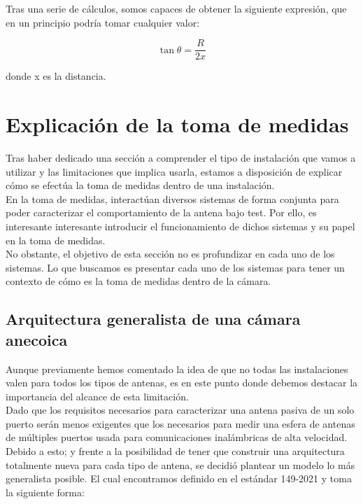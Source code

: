 \documentclass{article}
\begin{document}
Tras una serie de cálculos, somos capaces de obtener la siguiente expresión, que en un principio podría tomar cualquier valor: 

                        \begin{equation}
                        \tan\theta =\frac{R}{2x}
                        \end{equation}

donde x es la distancia. 

\newpage
\section{Explicación de la toma de medidas}
Tras haber dedicado una sección a comprender el tipo de instalación que vamos a utilizar y las limitaciones que implica usarla, estamos a disposición de explicar cómo se efectúa la toma de medidas dentro de una instalación.\\
En la toma de medidas, interactúan diversos sistemas de forma conjunta para poder caracterizar el comportamiento de la antena bajo test. Por ello, es interesante interesante introducir el funcionamiento de dichos sistemas y su papel en la toma de medidas. 
\\

No obstante, el objetivo de esta sección no es profundizar en cada uno de los sistemas. Lo que buscamos es presentar cada uno de los sistemas para tener un contexto de cómo es la toma de medidas dentro de la cámara.

\subsection{Arquitectura generalista de una cámara anecoica} 

Aunque previamente hemos comentado la idea de que no todas las instalaciones valen para todos los tipos de antenas, es en este punto donde debemos destacar la importancia del alcance de esta limitación.\\
Dado que los requisitos necesarios para caracterizar una antena pasiva de un solo puerto serán menos exigentes que los necesarios para medir una esfera de antenas de múltiples puertos usada para comunicaciones inalámbricas de alta velocidad. 
\\

Debido a esto; y frente a la posibilidad de tener que construir una arquitectura totalmente nueva para cada tipo de antena, se decidió plantear un modelo lo más generalista posible. El cual encontramos definido en el estándar 149-2021 \autocite{IEEEstd} y toma la siguiente forma:
\newpage
\end{document}
